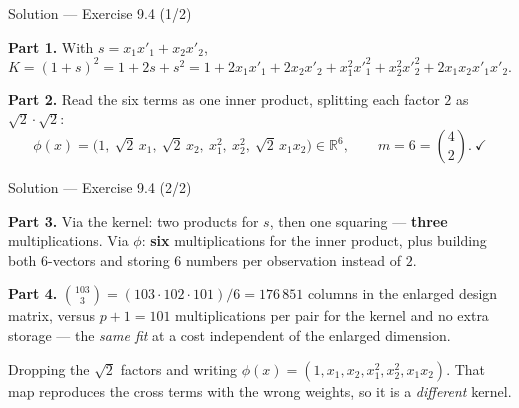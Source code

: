 \documentclass[aspectratio=169,11pt]{beamer}
\begin{document}
\begin{frame}{Solution --- Exercise 9.4 (1/2)}
\begin{solutionbox}
  \scriptsize
  \textbf{Part 1.} With $s = x_1x'_1 + x_2x'_2$,
  \[
    K = (1+s)^2 = 1 + 2s + s^2
      = 1 + 2x_1x'_1 + 2x_2x'_2 + x_1^2x'^2_1 + x_2^2x'^2_2
        + 2x_1x_2x'_1x'_2 .
  \]

  \textbf{Part 2.} Read the six terms as one inner product, splitting each
  factor $2$ as $\sqrt2\cdot\sqrt2$:
  \[
    \phi(x) = \big(1,\ \sqrt2\,x_1,\ \sqrt2\,x_2,\ x_1^2,\ x_2^2,\
                    \sqrt2\,x_1x_2\big) \in \mathbb{R}^6,
    \qquad m = 6 = \binom{4}{2}. \ \checkmark
  \]
\end{solutionbox}
\end{frame}

\begin{frame}{Solution --- Exercise 9.4 (2/2)}
\begin{solutionbox}
  \textbf{Part 3.} Via the kernel: two products for $s$, then one squaring ---
  \textbf{three} multiplications. Via $\phi$: \textbf{six} multiplications for
  the inner product, plus building both $6$-vectors and storing $6$ numbers per
  observation instead of $2$.

  \textbf{Part 4.}
  $\binom{103}{3} = (103\cdot102\cdot101)/6 = 176\,851$ columns in the enlarged
  design matrix, versus $p+1 = 101$ multiplications per pair for the kernel and
  no extra storage --- the \emph{same fit} at a cost independent of the
  enlarged dimension.
\end{solutionbox}
\begin{mistake}
  Dropping the $\sqrt2$ factors and writing
  $\phi(x)=(1,x_1,x_2,x_1^2,x_2^2,x_1x_2)$. That map reproduces the cross
  terms with the wrong weights, so it is a \emph{different} kernel.
\end{mistake}
\end{frame}
\end{document}
